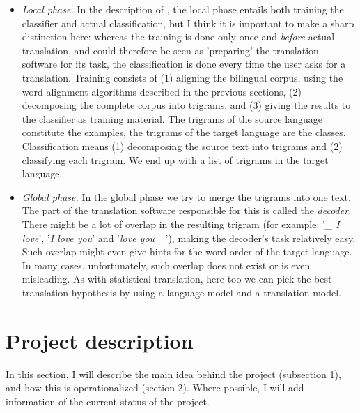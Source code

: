 \documentclass[12pt]{article}
\begin{document}
\begin{itemize}
\item \emph{Local phase.} In the description of \citet{vdbb09}, the local phase entails both training the classifier and actual classification, but I think it is important to make a sharp distinction here: whereas the training is done only once and \emph{before} actual translation, and could therefore be seen as 'preparing' the translation software for its task, the classification is done every time the user asks for a translation. Training consists of (1) aligning the bilingual corpus, using the word alignment algorithms described in the previous sections, (2) decomposing the complete corpus into trigrams, and (3) giving the results to the classifier as training material. The trigrams of the source language constitute the examples, the trigrams of the target language are the classes. Classification means (1) decomposing the source text into trigrams and (2) classifying each trigram. We end up with a list of trigrams in the target language.


\item \emph{Global phase.} In the global phase we try to merge the trigrams into one text. The part of the translation software responsible for this is called the \emph{decoder}. There might be a lot of overlap in the resulting trigram (for example: '\emph{\_ I love}', '\emph{I love you}' and '\emph{love you \_}'), making the decoder's task relatively easy. Such overlap might even give hints for the word order of the target language. In many cases, unfortunately, such overlap does not exist or is even misleading. As with statistical translation, here too we can pick the best translation hypothesis by using a language model and a translation model. 


\end{itemize}







\section{Project description}

In this section, I will describe the main idea behind the project (subsection 1), and how this is operationalized (section 2). Where possible, I will add information of the current status of the project.
\end{document}
